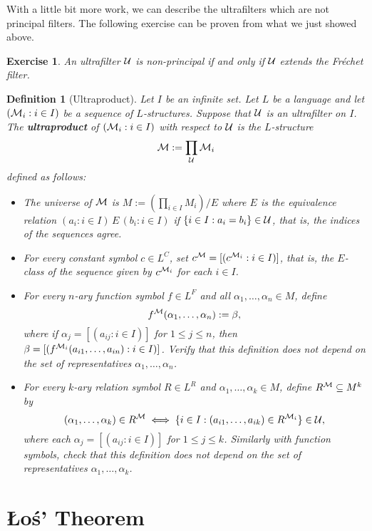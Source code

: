 \documentclass[10pt]{article}
\theoremstyle{newstyle}
\newtheorem{defn}[thm]{Definition}
\newtheorem{exercise}[thm]{Exercise}
\begin{document}
With a little bit more work, we can describe the ultrafilters which are not principal filters. 
The following exercise can be proven from what we just showed above. 

\begin{exercise}
An ultrafilter ${\cal U}$ is non-principal 
if and only if ${\cal U}$ extends the Fr\'echet filter.
\end{exercise}

\begin{defn}[Ultraproduct]
Let $I$ be an infinite set. Let $L$ be a language and let $({\cal M}_i : i \in I)$ be a sequence of
$L$-structures. Suppose that ${\cal U}$ is an ultrafilter on $I$. The {\bf ultraproduct} 
of $({\cal M}_i : i \in I)$ with respect to ${\cal U}$ is the $L$-structure 
\[ {\cal M} := \prod_{\cal U} {\cal M}_i \] 
defined as follows:
\begin{itemize}
    \item The universe of ${\cal M}$ is $M := (\prod_{i\in I} M_i) / E$ where $E$ is the equivalence 
    relation $(a_i : i \in I) \, E \, (b_i : i \in I)$ if $\{i \in I : a_i = b_i\} \in 
    {\cal U}$, that is, the indices of the sequences agree.
    \item For every constant symbol $c \in L^C$, set $c^{\cal M} = 
    [(c^{{\cal M}_i} : i \in I)]$, that is, the $E$-class of the sequence 
    given by $c^{{\cal M}_i}$ for each $i \in I$. 
    \item For every $n$-ary function symbol $f \in L^F$ and all 
    $\alpha_1, \dots, \alpha_n \in M$, define 
    \[ f^{\cal M}(\alpha_1, \dots, \alpha_n) := \beta, \] 
    where if $\alpha_j = [(a_{ij} : i \in I)]$ for $1 \leq j \leq n$, then 
    $\beta = [(f^{{\cal M}_i}(a_{i1}, \dots, a_{in}) : i \in I)]$. Verify that 
    this definition does not depend on the set of representatives $\alpha_1, \dots, \alpha_n$. 
    \item For every $k$-ary relation symbol $R \in L^R$ and $\alpha_1, \dots, \alpha_k \in M$, 
    define $R^{\cal M} \subseteq M^k$ by 
    \[ (\alpha_1, \dots, \alpha_k) \in R^{\cal M} \iff \{i \in I : 
    (a_{i1}, \dots, a_{ik}) \in R^{{\cal M}_i}\} \in {\cal U}, \] 
    where each $\alpha_j = [(a_{ij} : i \in I)]$ for $1 \leq j \leq k$. Similarly with 
    function symbols, check that this definition does not depend on the set of 
    representatives $\alpha_1, \dots, \alpha_k$. 
\end{itemize}
\end{defn}

\newpage 
\section{\L{}o\'s' Theorem}
\end{document}
